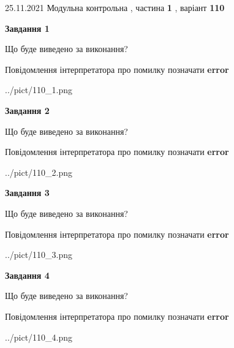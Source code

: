 \documentclass[10pt, ukrainian]{article}
\begin{document}
{25.11.2021 Модульна контрольна , частина \textbf { 1 }, варіант  \No \textbf { 110 }\par}
{
\begin {large}

{\begin {center}\textbf{Завдання 1}\end {center}}\par
Що буде виведено за виконання? \par
Повідомлення інтерпретатора про помилку позначати \textbf{error}

\begin{center}
	{../pict/110_1.png}
\end{center}
\newpage

{\begin {center}\textbf{Завдання 2}\end {center}}\par
Що буде виведено за виконання? \par
Повідомлення інтерпретатора про помилку позначати \textbf{error}

\begin{center}
	{../pict/110_2.png}
\end{center}
\newpage

{\begin {center}\textbf{Завдання 3}\end {center}}\par
Що буде виведено за виконання? \par
Повідомлення інтерпретатора про помилку позначати \textbf{error}

\begin{center}
	{../pict/110_3.png}
\end{center}
\newpage

{\begin {center}\textbf{Завдання 4}\end {center}}\par
Що буде виведено за виконання? \par
Повідомлення інтерпретатора про помилку позначати \textbf{error}

\begin{center}
	{../pict/110_4.png}
\end{center}
\newpage


\end{large}}
\end{document}
